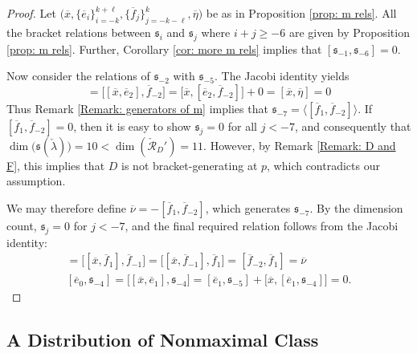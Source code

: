 \documentclass[11pt,letterpaper]{amsart}
\numberwithin{equation}{section}
\newcommand{\oline}{\overline}
\begin{document}
\begin{proof}
    Let $\big(\oline x,\{\oline e_i\}_{i=-k}^{k+\ell},\{\oline f_j\}_{j=-k-\ell}^k,\oline \eta\big)$ be as in Proposition \ref{prop: m rels}. All the bracket relations between ${\mathfrak s}_i$ and ${\mathfrak s}_j$ where $i+j\geq-6$ are given by Proposition \ref{prop: m rels}. Further, Corollary \ref{cor: more m rels} implies that $[{\mathfrak s}_{-1},{\mathfrak s}_{-6}]=0$.
    
    Now consider the relations of ${\mathfrak s}_{-2}$ with ${\mathfrak s}_{-5}$. The Jacobi identity yields 
    \begin{equation}
        [\oline e_1,\oline f_{-2}] = \big[[\oline x,\oline e_2],\oline f_{-2}\big] =  \big [\oline x,[\oline e_2,\oline f_{-2}]\big] + 0 = [\oline x, \oline \eta] = 0
    \end{equation}
    Thus Remark \ref{Remark: generators of m} implies that ${\mathfrak s}_{-7} = \big\langle [\oline f_1,\oline f_{-2}]\big\rangle$. If $[\oline f_1,\oline f_{-2}]=0$, then it is easy to show ${\mathfrak s}_j=0$ for all $j<-7$, and consequently that $\dim\big({\mathfrak s}({\check\lambda})\big) = 10<\dim(\check{\mathcal R}_D') = 11$. However, by Remark \ref{Remark: D and F}, this implies that $D$ is not bracket-generating at $p$, which contradicts our assumption. 
    
    We may therefore define $\oline \nu = -[\oline f_1,\oline f_{-2}]$, which generates ${\mathfrak s}_{-7}$. By the dimension count, ${\mathfrak s}_{j}=0$ for $j<-7$, and the final required relation follows from the Jacobi identity:
    \begin{gather}
        [\oline f_0,\oline f_{-1}] = \big[[\oline x,\oline f_1],\oline f_{-1}\big] = \big[[\oline x,\oline f_{-1}],\oline f_1\big] = [\oline f_{-2},\oline f_1] = \oline \nu
        \\
        [\oline e_0, \mathfrak s_{-4}] = \big[[\oline x , \oline e_{1}],\mathfrak s_{-4}\big] =  [\oline e_{1},\mathfrak s_{-5}] + \big[\oline x,[\oline e_1,\mathfrak s_{-4}]\big] = 0.
    \end{gather}
\end{proof}

\subsection{A Distribution of Nonmaximal Class}
\label{subsection: nonmax model}

\end{document}
